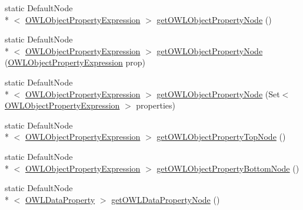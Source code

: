 \begin{DoxyCompactItemize}
static Default\-Node\\*
$<$ \hyperlink{interfaceorg_1_1semanticweb_1_1owlapi_1_1model_1_1_o_w_l_object_property_expression}{O\-W\-L\-Object\-Property\-Expression} $>$ \hyperlink{classorg_1_1semanticweb_1_1owlapi_1_1reasoner_1_1impl_1_1_node_factory_afaedcc09c69f2a5a497ec35a9f2bf86b}{get\-O\-W\-L\-Object\-Property\-Node} ()
\item 
static Default\-Node\\*
$<$ \hyperlink{interfaceorg_1_1semanticweb_1_1owlapi_1_1model_1_1_o_w_l_object_property_expression}{O\-W\-L\-Object\-Property\-Expression} $>$ \hyperlink{classorg_1_1semanticweb_1_1owlapi_1_1reasoner_1_1impl_1_1_node_factory_a6ea832e24626a63dcaf5e2073beb350a}{get\-O\-W\-L\-Object\-Property\-Node} (\hyperlink{interfaceorg_1_1semanticweb_1_1owlapi_1_1model_1_1_o_w_l_object_property_expression}{O\-W\-L\-Object\-Property\-Expression} prop)
\item 
static Default\-Node\\*
$<$ \hyperlink{interfaceorg_1_1semanticweb_1_1owlapi_1_1model_1_1_o_w_l_object_property_expression}{O\-W\-L\-Object\-Property\-Expression} $>$ \hyperlink{classorg_1_1semanticweb_1_1owlapi_1_1reasoner_1_1impl_1_1_node_factory_a8d8b705ab4513972e184cddf27f57ffa}{get\-O\-W\-L\-Object\-Property\-Node} (Set$<$ \hyperlink{interfaceorg_1_1semanticweb_1_1owlapi_1_1model_1_1_o_w_l_object_property_expression}{O\-W\-L\-Object\-Property\-Expression} $>$ properties)
\item 
static Default\-Node\\*
$<$ \hyperlink{interfaceorg_1_1semanticweb_1_1owlapi_1_1model_1_1_o_w_l_object_property_expression}{O\-W\-L\-Object\-Property\-Expression} $>$ \hyperlink{classorg_1_1semanticweb_1_1owlapi_1_1reasoner_1_1impl_1_1_node_factory_ad98280dd61f7a957a0f360056989f260}{get\-O\-W\-L\-Object\-Property\-Top\-Node} ()
\item 
static Default\-Node\\*
$<$ \hyperlink{interfaceorg_1_1semanticweb_1_1owlapi_1_1model_1_1_o_w_l_object_property_expression}{O\-W\-L\-Object\-Property\-Expression} $>$ \hyperlink{classorg_1_1semanticweb_1_1owlapi_1_1reasoner_1_1impl_1_1_node_factory_a2efeb722f4c03aedffbefe87b5e55098}{get\-O\-W\-L\-Object\-Property\-Bottom\-Node} ()
\item 
static Default\-Node\\*
$<$ \hyperlink{interfaceorg_1_1semanticweb_1_1owlapi_1_1model_1_1_o_w_l_data_property}{O\-W\-L\-Data\-Property} $>$ \hyperlink{classorg_1_1semanticweb_1_1owlapi_1_1reasoner_1_1impl_1_1_node_factory_a0af84939c836ce79e8e50ca8af762d30}{get\-O\-W\-L\-Data\-Property\-Node} ()

\end{DoxyCompactItemize}
